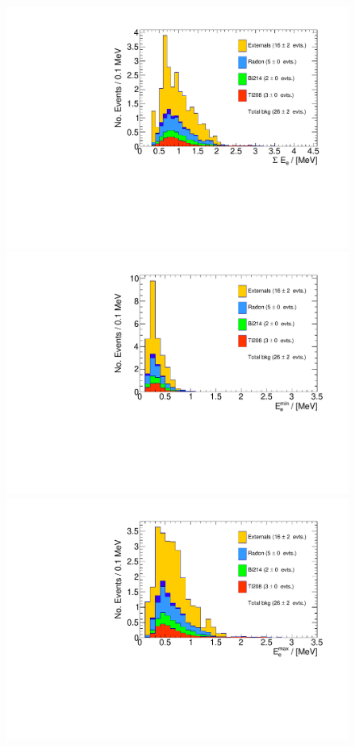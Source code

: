 \documentclass[main.tex]{subfiles}
\begin{document}
\begin{figure}[h!]
\centering
\includegraphics[scale=0.35]{pictures/FinalResults/bb2nu2/150/preselection/preSelection2e2gBKG_tot_e_energy.pdf}
\includegraphics[scale=0.35]{pictures/FinalResults/bb2nu2/150/preselection/preSelection2e2gBKG_min_e_energy.pdf}
\includegraphics[scale=0.35]{pictures/FinalResults/bb2nu2/150/preselection/preSelection2e2gBKG_max_e_energy.pdf}

\end{figure}
\end{document}
